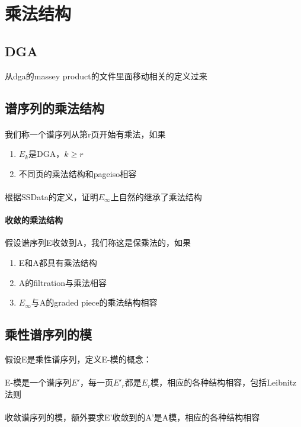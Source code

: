 \documentclass[12pt]{article}
\begin{document}
\sffamily
\huge


\section{乘法结构}
\subsection{DGA}
从dga的massey product的文件里面移动相关的定义过来
\subsection{谱序列的乘法结构}
\paragraph{}我们称一个谱序列从第r页开始有乘法，如果
\begin{enumerate}
    \item $E_k$是DGA，$k\geq r$
    \item 不同页的乘法结构和pageiso相容
\end{enumerate}

\paragraph{}根据SSData的定义，证明$E_\infty$上自然的继承了乘法结构

\paragraph{收敛的乘法结构}
假设谱序列E收敛到A，我们称这是保乘法的，如果
\begin{enumerate}
    \item E和A都具有乘法结构
    \item A的filtration与乘法相容
    \item $E_\infty$与A的graded piece的乘法结构相容
\end{enumerate}

\subsection{乘性谱序列的模}
假设E是乘性谱序列，定义E-模的概念：
\paragraph{}E-模是一个谱序列$E'$，每一页$E'_r$都是$E_r$模，相应的各种结构相容，包括Leibnitz法则

\paragraph{}收敛谱序列的模，额外要求E'收敛到的A'是A模，相应的各种结构相容
\end{document}
